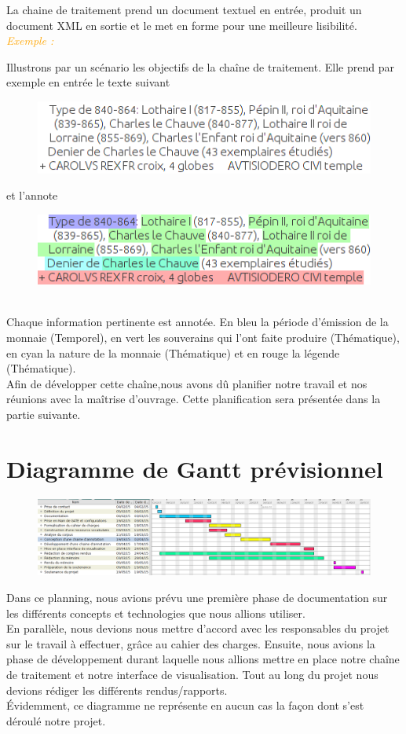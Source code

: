 \documentclass[a4paper, 11pt]{report}
\newenvironment{exemple}
    {
    \textit{\textcolor{orange}{
    Exemple : \\}}
    }
    {~\\
    }
\begin{document}
	La chaine de traitement prend un document textuel en entrée, produit un document XML en sortie et le met en forme pour une meilleure lisibilité.\\
	\begin{exemple}
\noindent Illustrons par un scénario les objectifs de la chaîne de traitement.
Elle prend par exemple en entrée le texte suivant

\begin{figure}[h!]
\centering
\includegraphics[scale=.5]{img/exemple_text.png}
\end{figure}

et l'annote
\end{exemple}
\begin{figure}[h!]
\centering
\includegraphics[scale=.5]{img/exemple_text_ann.png} 
\end{figure}\\
Chaque information pertinente est annotée. En bleu la période d'émission de la monnaie (Temporel), en vert les souverains qui l'ont faite produire (Thématique), en cyan la nature de la monnaie (Thématique) et en rouge la légende (Thématique).\\
Afin de développer cette chaîne,nous avons dû planifier notre travail et nos réunions avec la maîtrise d'ouvrage. Cette planification sera présentée dans la partie suivante.

	\section{Diagramme de Gantt prévisionnel}
	\begin{figure}[H]
	\includegraphics[scale=.3]{img/ganttPrev.png}
	\end{figure}
	Dans ce planning, nous avions prévu une première phase de documentation sur les différents concepts et technologies que nous allions utiliser. \\
En parallèle, nous devions nous mettre d’accord avec les responsables du projet sur le travail à effectuer, grâce au cahier des charges.
Ensuite, nous avions la phase de développement durant laquelle nous allions mettre en place notre chaîne de traitement et notre interface de visualisation. Tout au long du projet nous devions rédiger les différents rendus/rapports.\\
Évidemment, ce diagramme  ne représente en aucun cas la façon dont s’est déroulé notre projet.
\end{document}
